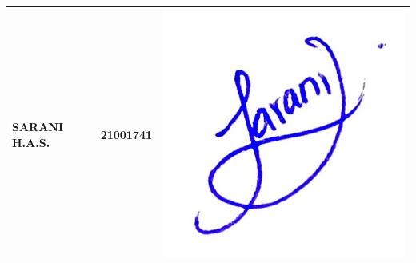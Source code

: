 \begin{table}[ht]
\begin{tabularx}{\textwidth}{ |X|c|X| }
	\hline
	     SARANI H.A.S. & 21001741 & \includegraphics[scale=0.07]{Images/Signs/sarani.jpeg}  \\
	\hline
    \end{tabularx}
    
\end{table}